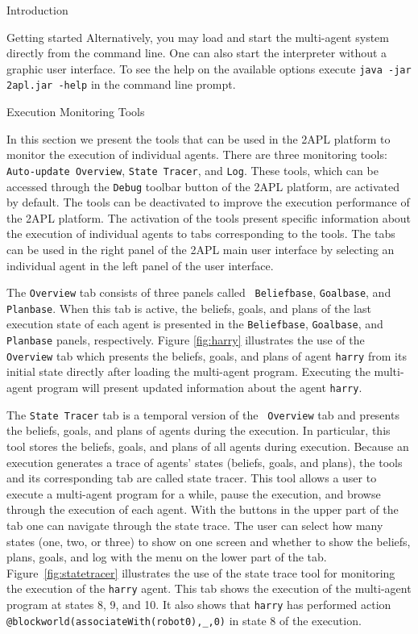 \begin{chapter}{Introduction}
\begin{section}{Getting started}
Alternatively, you may load and start the multi-agent system directly from the command line. One can also start the interpreter without a graphic user interface. To see the help on the available options execute \texttt{java -jar 2apl.jar -help} in the command line prompt.

\end{section}



\begin{section}{Execution Monitoring Tools}

In this section we present the tools that can be used in the 2APL
platform to monitor the execution of individual agents. There are
three monitoring tools: {\tt Auto-update Overview}, {\tt State
Tracer}, and {\tt Log}. These tools, which can be accessed through
the {\tt Debug} toolbar button of the 2APL platform, are activated
by default. The tools can be deactivated to improve the execution
performance of the 2APL platform. The activation of the tools
present specific information about the execution of individual
agents to tabs corresponding to the tools. The tabs can be used in
the right panel of the 2APL main user interface by selecting an
individual agent in the left panel of the user interface.

The {\tt Overview} tab consists of three panels called {\tt
Beliefbase}, {\tt Goalbase}, and {\tt Planbase}. When this tab is
active, the beliefs, goals, and plans of the last execution state of
each agent is presented in the {\tt Beliefbase}, {\tt Goalbase}, and
{\tt Planbase} panels, respectively. Figure \ref{fig:harry}
illustrates the use of the {\tt Overview} tab which presents the
beliefs, goals, and plans of agent {\tt harry} from its initial
state directly after loading the multi-agent program. Executing the
multi-agent program will present updated information about the agent
{\tt harry}.

The {\tt State Tracer} tab is a temporal version of the {\tt
Overview} tab and presents the beliefs, goals, and plans of agents
during the execution. In particular, this tool stores the beliefs,
goals, and plans of all agents during execution. Because an
execution generates a trace of agents' states (beliefs, goals, and
plans), the tools and its corresponding tab are called state tracer.
This tool allows a user to execute a multi-agent program for a
while, pause the execution, and browse through the execution of each
agent. With the buttons in the upper part of the tab one can
navigate through the state trace. The user can select how many
states (one, two, or three) to show on one screen and whether to
show the beliefs, plans, goals, and log with the menu on the lower
part of the tab. Figure~\ref{fig:statetracer} illustrates the use of
the state trace tool for monitoring the execution of the {\tt harry}
agent. This tab shows the execution of the multi-agent program at
states 8, 9, and 10. It also shows that {\tt harry} has performed
action {\tt @blockworld(associateWith(robot0),\_,0)} in state 8 of
the execution.


\end{section}
\end{chapter}
